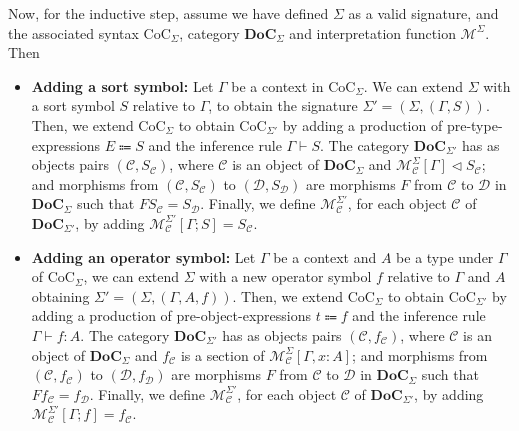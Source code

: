 Now, for the inductive step, assume we have defined $\Sigma$ as a valid signature, and the associated syntax
$\text{CoC}_\Sigma$, category $\mathbf{DoC}_\Sigma$ and interpretation function $\mathcal{M}^\Sigma$. Then 
\begin{itemize}
    \item \textbf{Adding a sort symbol:} 
          Let $\Gamma$ be a context in $\text{CoC}_\Sigma$. We can extend $\Sigma$
          with a sort symbol $S$ relative to $\Gamma$, to obtain the signature $\Sigma' = (\Sigma, (\Gamma, S))$.
          Then, we extend $\text{CoC}_\Sigma$ to obtain $\text{CoC}_{\Sigma'}$ by adding a production of 
          pre-type-expressions $E \Coloneqq S$ and the inference rule $\Gamma \vdash S$.
          The category $\mathbf{DoC}_{\Sigma'}$ has as objects pairs $(\mathcal{C}, S_\mathcal{C})$, where 
          $\mathcal{C}$ is an object of $\mathbf{DoC}_\Sigma$ and $\mathcal{M}^\Sigma_\mathcal{C}[\Gamma] \lhd S_\mathcal{C}$;
          and morphisms from $(\mathcal{C}, S_\mathcal{C})$ to $(\mathcal{D}, S_\mathcal{D})$ are morphisms $F$ from $\mathcal{C}$ to $\mathcal{D}$ in $\mathbf{DoC}_\Sigma$
          such that $F S_\mathcal{C} = S_\mathcal{D}$.
          Finally, we define $\mathcal{M}^{\Sigma'}_\mathcal{C}$, for each object $\mathcal{C}$ of $\mathbf{DoC}_{\Sigma'}$,
          by adding $\mathcal{M}^{\Sigma'}_\mathcal{C}[\Gamma; S] = S_\mathcal{C}$.
    \item \textbf{Adding an operator symbol:}
          Let $\Gamma$ be a context and $A$ be a type under $\Gamma$ of $\text{CoC}_\Sigma$,
          we can extend $\Sigma$ with a new operator symbol $f$ relative to $\Gamma$ and $A$
          obtaining $\Sigma' = (\Sigma, (\Gamma, A, f))$.
          Then, we extend $\text{CoC}_\Sigma$ to obtain $\text{CoC}_{\Sigma'}$ by adding a production of 
          pre-object-expressions $t \Coloneqq f$ and the inference rule $\Gamma \vdash f \colon A$.
          The category $\mathbf{DoC}_{\Sigma'}$ has as objects pairs $(\mathcal{C}, f_\mathcal{C})$,
          where $\mathcal{C}$ is an object of $\mathbf{DoC}_\Sigma$ and $f_\mathcal{C}$ is a section of $\mathcal{M}^\Sigma_\mathcal{C}[\Gamma, x \colon A]$;
          and morphisms from $(\mathcal{C}, f_\mathcal{C})$ to $(\mathcal{D}, f_\mathcal{D})$ are morphisms $F$ from $\mathcal{C}$ to $\mathcal{D}$ in $\mathbf{DoC}_\Sigma$
          such that $F f_\mathcal{C} = f_\mathcal{D}$.
          Finally, we define $\mathcal{M}^{\Sigma'}_\mathcal{C}$, for each object $\mathcal{C}$ of $\mathbf{DoC}_{\Sigma'}$,
          by adding $\mathcal{M}^{\Sigma'}_\mathcal{C}[\Gamma; f] = f_\mathcal{C}$.

\end{itemize}
